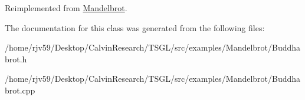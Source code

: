 Reimplemented from \hyperlink{class_mandelbrot_ab7918e4de8f00f73290f110ca7a6cffd}{Mandelbrot}.



The documentation for this class was generated from the following files\+:\begin{DoxyCompactItemize}
\item 
/home/rjv59/\+Desktop/\+Calvin\+Research/\+T\+S\+G\+L/src/examples/\+Mandelbrot/Buddhabrot.\+h\item 
/home/rjv59/\+Desktop/\+Calvin\+Research/\+T\+S\+G\+L/src/examples/\+Mandelbrot/Buddhabrot.\+cpp\end{DoxyCompactItemize}
